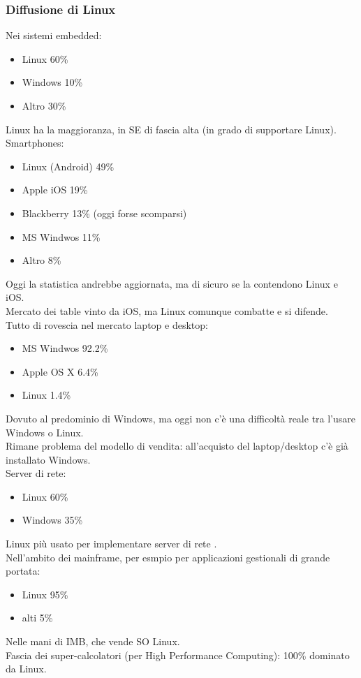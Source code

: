 \documentclass{article}
\begin{document}
\subsubsection{Diffusione di Linux}
Nei sistemi embedded:
\begin{itemize}
\item Linux 60\%
\item Windows 10\%
\item Altro 30\%
\end{itemize}
Linux ha la maggioranza, in SE di fascia alta (in grado di supportare Linux).\\ Smartphones:
\begin{itemize}
\item Linux (Android) 49\%
\item Apple iOS 19\%
\item Blackberry 13\% (oggi forse scomparsi)
\item MS Windwos 11\%
\item Altro 8\%
\end{itemize}
Oggi la statistica andrebbe aggiornata, ma di sicuro se la contendono Linux e iOS.\\ Mercato dei table vinto da iOS, ma Linux comunque combatte e si difende.\\ Tutto di rovescia nel mercato laptop e desktop:
\begin{itemize}
\item MS Windwos 92.2\%
\item Apple OS X 6.4\%\\
\item Linux 1.4\%
\end{itemize}
Dovuto al predominio di Windows, ma oggi non c'è una difficoltà reale tra l'usare Windows o Linux.\\ Rimane problema del modello di vendita: all'acquisto del laptop/desktop c'è già installato Windows.\\ Server di rete:
\begin{itemize}
\item Linux 60\%
\item Windows 35\%
\end{itemize}
Linux più usato per implementare server di rete .\\ Nell'ambito dei mainframe, per esmpio per applicazioni gestionali di grande portata:
\begin{itemize}
\item Linux 95\%
\item alti 5\%
\end{itemize}
Nelle mani di IMB, che vende SO Linux.\\ Fascia dei super-calcolatori (per High Performance Computing): 100\% dominato da Linux.
\end{document}
